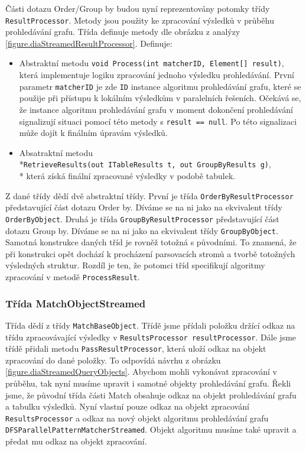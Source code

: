 Části dotazu Order/Group by budou nyní reprezentovány potomky třídy \texttt{ResultProcessor}.
Metody jsou použity ke zpracování výsledků v průběhu prohledávání grafu.
Třída definuje metody dle obrázku z analýzy \ref{figure.diaStreamedResultProcessor}.
Definuje:
\begin{itemize}
\item Abstraktní metodu \texttt{void Process(int matcherID, Element[] result)}, která implementuje logiku zpracování jednoho výsledku prohledávání.
První parametr \texttt{matcherID} je zde \texttt{ID} instance algoritmu prohledávání grafu, které se použije při přístupu k lokálním výsledkům v paralelních řešeních.
Očekává se, že instance algoritmu prohledávání grafu v moment dokončení prohledávání signalizují situaci pomocí této metody s \texttt{result == null}.
Po této signalizaci může dojít k finálním úpravám výsledků.
\item Absatraktní metodu \\*\texttt{RetrieveResults(out ITableResults t, out GroupByResults g)},\\* která získá finální zpracované výsledky v podobě tabulek. 
\end{itemize}
Z dané třídy dědí dvě abstraktní třídy.
První je třída \texttt{OrderByResultProcessor} představující část dotazu Order by.
Díváme se na ni jako na ekvivalent třídy \texttt{OrderByObject}. 
Druhá je třída \texttt{GroupByResultProcessor} představující část dotazu Group by.
Díváme se na ni jako na ekvivalent třídy \texttt{GroupByObject}.
Samotná konstrukce daných tříd je rovněž totožná s původními.
To znamená, že při konstrukci opět dochází k procházení parsovacích stromů a tvorbě totožných výsledných struktur.
Rozdíl je ten, že potomci tříd specifikují algoritmy zpracování v metodě \texttt{ProcessResult}.   

\subsubsection{Třída MatchObjectStreamed}

Třída dědí z třídy \texttt{MatchBaseObject}.
Třídě jsme přídali položku držící odkaz na třídu zpracovávající výsledky v \texttt{ResultsProcessor resultProcessor}.
Dále jsme třídě přidali metodu \texttt{PassResultProcessor}, která uloží odkaz na objekt zpracování do dané položky.
To odpovídá návrhu z obrázku \ref{figure.diaStreamedQueryObjects}.
Abychom mohli vykonávat zpracování v průběhu, tak nyní musíme upravit i samotné objekty prohledávání grafu.
Řekli jsme, že původní třída části Match obsahuje odkaz na objekt prohledávání grafu a tabulku výsledků.
Nyní vlastní pouze odkaz na objekt zpracování \texttt{ResultsProcessor} a odkaz na nový objekt algoritmu prohledávání grafu \texttt{DFSParallelPatternMatcherStreamed}.
Objekt algoritmu musíme také upravit a předat mu odkaz na objekt zpracování.


